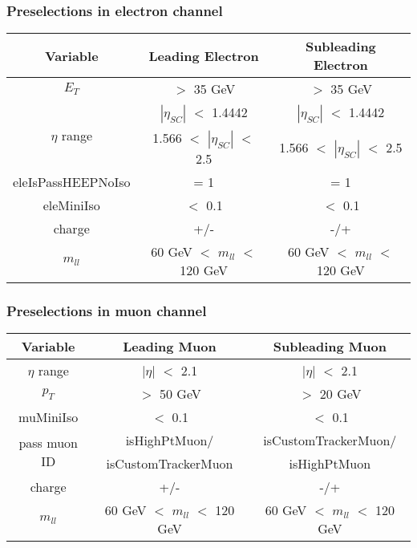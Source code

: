 \documentclass[aspectratio=169]{beamer}
\begin{document}
\begin{frame}
  \frametitle{Preselections in electron channel}
  \justifying
  \begin{footnotesize}
    \begin{center}
      \begin{tabular}{ | c | c | c | }
        \hline
        \bf Variable & \bf Leading Electron & \bf Subleading Electron \\
        \hline
        $E_T$              & $>$ 35 GeV & $>$ 35 GeV \\
        \multirow{2}{*}{$\eta$ range} & $|\eta_{SC}|$ $<$ 1.4442 & $|\eta_{SC}|$ $<$ 1.4442 \\
        & 1.566 $<$ $|\eta_{SC}|$ $<$ 2.5 & 1.566 $<$ $|\eta_{SC}|$ $<$ 2.5 \\
        eleIsPassHEEPNoIso & = 1        & = 1 \\
        eleMiniIso         & $<$ 0.1    & $<$ 0.1 \\
        charge             & +/-        & -/+ \\
        $m_{ll}$           & 60 GeV $<$ $m_{ll}$ $<$ 120 GeV & 60 GeV $<$ $m_{ll}$ $<$ 120 GeV \\
        \hline
      \end{tabular}
    \end{center}
  \end{footnotesize}
\end{frame}

\begin{frame}
  \frametitle{Preselections in muon channel}
  \justifying
  \begin{footnotesize}
    \begin{center}
      \begin{tabular}{ | c | c | c | }
        \hline
        \bf Variable & \bf Leading Muon & \bf Subleading Muon \\
        \hline
        $\eta$ range & $|\eta|$ $<$ 2.1 & $|\eta|$ $<$ 2.1 \\
        $p_T$        & $>$ 50 GeV       & $>$ 20 GeV \\
        muMiniIso    & $<$ 0.1          & $<$ 0.1 \\
        \multirow{2}{*}{pass muon ID}   & isHighPtMuon/ & isCustomTrackerMuon/ \\
        & isCustomTrackerMuon & isHighPtMuon \\
        charge       & +/-              & -/+ \\
        $m_{ll}$      & 60 GeV $<$ $m_{ll}$ $<$ 120 GeV & 60 GeV $<$ $m_{ll}$ $<$ 120 GeV \\
        \hline
      \end{tabular}
    \end{center}   
  \end{footnotesize}
\end{frame}
\end{document}
